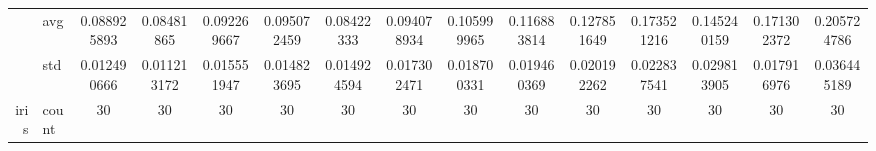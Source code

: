 \begin{table}[htbp]
{\begin{tabular}{rlccc|c|c|c|c|c|ccccc}
			                                                                               & avg                & \cellcolor[rgb]{ .518,  .78,  .486}0.088925893                                 & \cellcolor[rgb]{ .404,  .749,  .482}0.08481865                                 & \cellcolor[rgb]{ .612,  .808,  .494}0.092269667                                & \cellcolor[rgb]{ .69,  .831,  .498}0.095072459  & \cellcolor[rgb]{ .388,  .745,  .482}\textcolor[rgb]{ 0,  .38,  0}{0.08422333}  & \cellcolor[rgb]{ .663,  .824,  .498}0.094078934 & \cellcolor[rgb]{ 1,  .922,  .518}0.105999965                                   & \cellcolor[rgb]{ 1,  .867,  .51}0.116883814     & \cellcolor[rgb]{ .996,  .812,  .498}0.127851649 & \cellcolor[rgb]{ .984,  .576,  .455}0.173521216 & \cellcolor[rgb]{ .992,  .722,  .482}0.145240159 & \cellcolor[rgb]{ .984,  .588,  .455}0.171302372 & \cellcolor[rgb]{ .973,  .412,  .42}0.205724786  \\
			                                                                               & std                & 0.012490666                                                                    & 0.011213172                                                                    & 0.015551947                                                                    & 0.014823695                                     & 0.014924594                                                                    & 0.017302471                                     & 0.018700331                                                                    & 0.019460369                                     & 0.020192262                                     & 0.022837541                                     & 0.029813905                                     & 0.017916976                                     & 0.036445189                                     \\
			iris                                                                           & count              & 30                                                                             & 30                                                                             & 30                                                                             & 30                                              & 30                                                                             & 30                                              & 30                                                                             & 30                                              & 30                                              & 30                                              & 30                                              & 30                                              & 30                                              \\

\end{tabular}}
\end{table}

